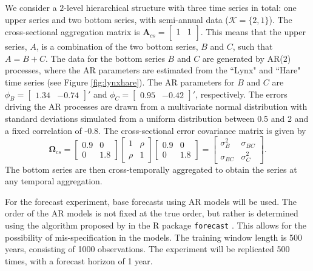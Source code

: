 \documentclass[a4paper,11pt]{article}
\newcommand{\Avet}{\bm{A}}
\newcommand{\Omegavet}{\bm{\Omega}}
\theoremstyle{definition}
\begin{document}
We consider a $2$-level hierarchical structure with three time series in total: one upper series and two bottom series, with semi-annual data ($\mathcal{K} = \{2,1\}$). The cross-sectional aggregation matrix is
$
\Avet_{cs} = \begin{bmatrix}
1 & 1 \\
\end{bmatrix}
$.
This means that the upper series, $A$, is a combination of the two bottom series, $B$ and $C$, such that $A = B+C$.
The data for the bottom series $B$ and $C$ are generated by AR($2$) processes, where the AR parameters are estimated from the “Lynx" and “Hare" time series (see Figure \ref{fig:lynxhare}). The AR parameters for $B$ and $C$ are
$
\phi_B = \begin{bmatrix}
1.34 &
-0.74
\end{bmatrix}'$ and $\phi_C = \begin{bmatrix}
0.95 &
-0.42
\end{bmatrix}'
$,
respectively. The errors driving the AR processes are drawn from a multivariate normal distribution with standard deviations simulated from a uniform distribution between 0.5 and 2 and a fixed correlation of -0.8. The cross-sectional error covariance matrix is given by
$$
\Omegavet_{cs} = \begin{bmatrix}
0.9 & 0 \\
0 & 1.8
\end{bmatrix} \begin{bmatrix}
1 & \rho \\
\rho & 1
\end{bmatrix} \begin{bmatrix}
0.9 & 0 \\
0 & 1.8
\end{bmatrix} = \begin{bmatrix}
\sigma_B^2 & \sigma_{BC} \\
\sigma_{BC} & \sigma_C^2
\end{bmatrix}.
$$
The bottom series are then cross-temporally aggregated to obtain the series at any temporal aggregation.

For the forecast experiment, base forecasts using AR models will be used. The order of the AR models is not fixed at the true order, but rather is determined using the algorithm proposed by \cite{hyndman2008a} in the \textsf{R} package \texttt{forecast} \citep{Rforecast}. This allows for the possibility of mis-specification in the models. The training window length is 500 years, consisting of 1000 observations. The experiment will be replicated 500 times, with a forecast horizon of 1 year.
\end{document}
